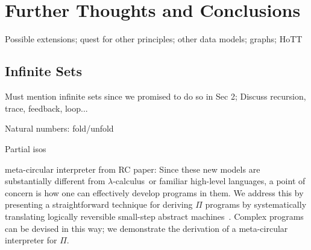 \documentclass{article}
\newcommand{\lcal}{\ensuremath{\lambda}-calculus}
\begin{document}
\begin{code}
\AgdaSymbol{(}\AgdaSpace{}%
\AgdaSpace{}%
\AgdaSymbol{))}\<%
\\
%
\>[1]\AgdaSpace{}%
\AgdaSpace{}%
\AgdaSpace{}%
\AgdaSpace{}%
\<%
\\
\>[1][@{}l@{\AgdaIndent{0}}]%
\>[2]\AgdaSymbol{((}\AgdaSpace{}%
\AgdaSpace{}%
\AgdaSymbol{)}%
\>[22]\AgdaSpace{}%
\AgdaSymbol{(}\AgdaSpace{}%
\AgdaSpace{}%
\AgdaSymbol{))}\<%
\\
%
\>[1]\AgdaSpace{}%
\AgdaSpace{}%
\<%
\\
\>[1][@{}l@{\AgdaIndent{0}}]%
\>[2]\AgdaSymbol{((}\AgdaSpace{}%
\AgdaSpace{}%
\AgdaSpace{}%
\AgdaSpace{}%
\AgdaSymbol{(}\AgdaSpace{}%
\AgdaSpace{}%
\AgdaSymbol{))}\AgdaSpace{}%
\AgdaSymbol{)}\<%
\end{code}
 
\section{Further Thoughts and Conclusions}

Possible extensions; quest for other principles; other data models; graphs; HoTT

\subsection{Infinite Sets} 

Must mention infinite sets since we promised to do so in Sec 2;
Discuss recursion, trace, feedback, loop...

Natural numbers: fold/unfold

Partial isos

meta-circular interpreter from RC paper: Since these new models are
substantially different from \lcal\ or familiar high-level languages,
a point of concern is how one can effectively develop programs in
them.  We address this by presenting a straightforward technique for
deriving $\Pi$ programs by systematically translating logically
reversible small-step abstract machines~\cite{isoint}. Complex
programs can be devised in this way; we demonstrate the derivation of
a meta-circular interpreter for $\Pi$.
\end{document}
